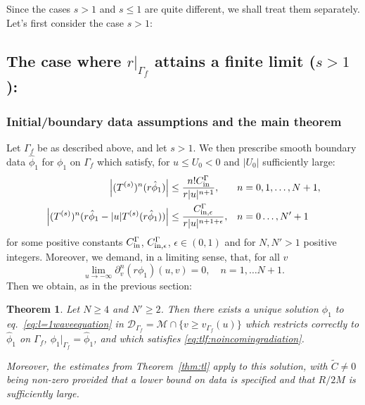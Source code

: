 \documentclass[11pt,english]{article}
\numberwithin{equation}{section}
\newtheorem{thm}{Theorem}[section]
\theoremstyle{remark}
\theoremstyle{plain}
\theoremstyle{remark}
\newcommand{\pv}{\partial_v}
\renewcommand{\(}{\left(}
\renewcommand{\)}{\right)}
\begin{document}

Since the cases $s>1$ and $s\leq1$ are quite different, we shall treat them separately. Let's first consider the case $s>1$:
\subsection{The case where \texorpdfstring{$r|_{\Gamma_f}$}{r-Gamma-f} attains a finite limit (\texorpdfstring{$s>1$}{s>1}):}
\subsubsection{Initial/boundary data assumptions and the main theorem}
Let $\Gamma_f$ be as described above, and let $s>1$. We then prescribe smooth boundary data $\hat{\phi}_1$ for $\phi_1$ on $\Gamma_f$ which satisfy, for $u\leq U_0< 0$ and $|U_0|$ sufficiently large:
\begin{align}\label{eq:tlf:boundarydata1}
\left|(T^{(s)})^n(r\hat{\phi}_1)\right|&\leq \frac{n! C_{\mathrm{in}}^\Gamma}{r|u|^{n+1}},&&n=0,1,\dots,N+1,\\
\left|(T^{(s)})^n(r\hat{\phi}_1-|u|T^{(s)}(r\hat{\phi}_1))\right|&\leq \frac{C_{\mathrm{in},\epsilon}^\Gamma}{r|u|^{n+1+\epsilon}},&& n=0\dots,N'+1\label{eq:tlf:boundarydata2}
\end{align}
for some positive constants $C_{\mathrm{in}}^\Gamma$, $C_{\mathrm{in},\epsilon}^\Gamma$, $\epsilon\in(0,1)$ and for  $N,N'>1$ positive integers.
Moreover, we demand, in a limiting sense, that, for all $v$
\begin{equation}\label{eq:tlf:noincomingradiation}
\lim_{u\to-\infty}\pv^n(r\phi_1)(u,v)=0,\quad n=1,\dots N+1.
\end{equation} 
Then we obtain, as in the previous section:
\begin{thm}\label{thm:tlf}
Let $N\geq 4$ and $N'\geq 2$. Then there exists a unique solution $\phi_1$ to eq.\ \eqref{eq:l=1waveequation} in $\mathcal{D}_{\Gamma_f}=\mathcal{M}\cap\{v\geq v_{\Gamma_f}(u)\}$ which restricts correctly to $\hat{\phi}_1$ on $\Gamma_f$, $\phi_1|_{\Gamma_f}=\hat{\phi}_1$, and which satisfies \eqref{eq:tlf:noincomingradiation}.

Moreover, the estimates from Theorem~\ref{thm:tl} apply to this solution, with $\tilde C\neq 0$ being non-zero provided that a lower bound on data is specified and that $R/2M$ is sufficiently large.
\end{thm}
\end{document}
